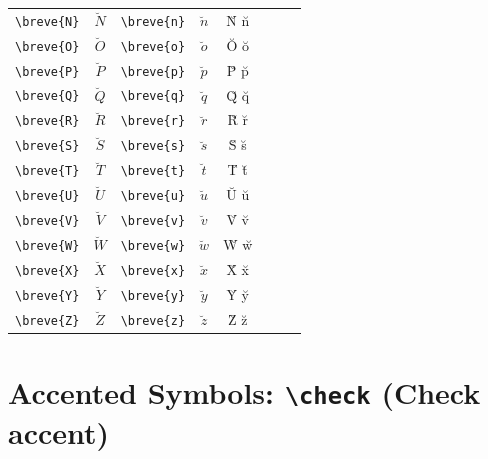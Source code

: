 \documentclass[12pt,a4paper]{article}
\begin{document}
\begin{longtable}{|l|c|l|c|c|l|c|c|}
\verb|\breve{N}| & $\breve{N}$     & \verb|\breve{n}| & $\breve{n}$     & N̆ n̆            &                  &                 & \\
\verb|\breve{O}| & $\breve{O}$     & \verb|\breve{o}| & $\breve{o}$     & Ŏ ŏ            &                  &                 & \\
\verb|\breve{P}| & $\breve{P}$     & \verb|\breve{p}| & $\breve{p}$     & P̆ p̆            &                  &                 & \\
\verb|\breve{Q}| & $\breve{Q}$     & \verb|\breve{q}| & $\breve{q}$     & Q̆ q̆            &                  &                 & \\
\verb|\breve{R}| & $\breve{R}$     & \verb|\breve{r}| & $\breve{r}$     & R̆ r̆            &                  &                 & \\
\verb|\breve{S}| & $\breve{S}$     & \verb|\breve{s}| & $\breve{s}$     & S̆ s̆            &                  &                 & \\
\verb|\breve{T}| & $\breve{T}$     & \verb|\breve{t}| & $\breve{t}$     & T̆ t̆            &                  &                 & \\
\verb|\breve{U}| & $\breve{U}$     & \verb|\breve{u}| & $\breve{u}$     & Ŭ ŭ            &                  &                 & \\
\verb|\breve{V}| & $\breve{V}$     & \verb|\breve{v}| & $\breve{v}$     & V̆ v̆            &                  &                 & \\
\verb|\breve{W}| & $\breve{W}$     & \verb|\breve{w}| & $\breve{w}$     & W̆ w̆            &                  &                 & \\
\verb|\breve{X}| & $\breve{X}$     & \verb|\breve{x}| & $\breve{x}$     & X̆ x̆            &                  &                 & \\
\verb|\breve{Y}| & $\breve{Y}$     & \verb|\breve{y}| & $\breve{y}$     & Y̆ y̆            &                  &                 & \\
\verb|\breve{Z}| & $\breve{Z}$     & \verb|\breve{z}| & $\breve{z}$     & Z̆ z̆            &                  &                 & \\
\hline
\end{longtable}

\newpage

\section*{Accented Symbols: \texttt{\textbackslash check} (Check accent)}
\end{document}

